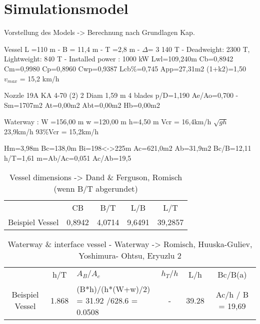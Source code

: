 \chapter{Simulationsmodel}
Vorstellung des Models -> Berechnung nach Grundlagen Kap.

Vessel L =110 m - B = 11,4 m - T =2,8 m - \(\Delta\)= 3 140 T - Deadweight: 
2300 T, 
Lightweight: 840 T - Installed power : 1000 kW
Lwl=109,240m Cb=0,8942 Cm=0,9980 Cp=0,8960 Cwp=0,9387 Lcb\%=0,745 App=27,31m2 
(1+k2)=1,50 \(v_{max}\) = 15,2 km/h

Nozzle 19A KA 4-70 (2) 2 Diam 1,59 m 4 blades p/D=1,190 Ae/Ao=0,700    -   
Sm=1707m2 At=0,00m2 Abt=0,00m2 Hb=0,00m2

Waterway : W =156,00 m   w =120,00 m    h=4,50 m Vcr = 16,4km/h 
\(\sqrt{gh}\)23,9km/h 93\%Vcr = 15,2km/h

Hm=3,98m   Bc=138,0m       Bi=198<->225m   Ac=621,0m2   Ab=31,9m2   
Bc/B=12,11   h/T=1,61   m=Ab/Ac=0,051   Ac/Ab=19,5

\begin{table}[htbp]
	\caption{Vessel dimensions -> 	Dand \& Ferguson, Romisch (wenn B/T 
	abgerundet)}
	\centering
	\begin{tabular}{c c c c c }
		& CB &B/T&L/B&L/T \\
		Beispiel Vessel & 0,8942 & 4,0714 & 9,6491 & 39,2857 \\
	
	\end{tabular}
\end{table}
\begin{table}[htbp]
	\caption{Waterway \& interface vessel - Waterway -> Romisch, Huuska-Guliev, 
	Yoshimura- Ohtsu, Eryuzlu 2}
	\centering
	\begin{tabular}{c c p{3cm} c c c }
		& h/T &\(A_B/A_c\)&\(h_T/h\) &L/h & Bc/B(a) \\
		Beispiel Vessel & 1.868 & (B*h)/(h*(W+w)/2) = 31.92 /628.6 = 0.0508& -  
		& 39.28 & Ac/h / B = 19,69\\
		
		
	\end{tabular}
\end{table}